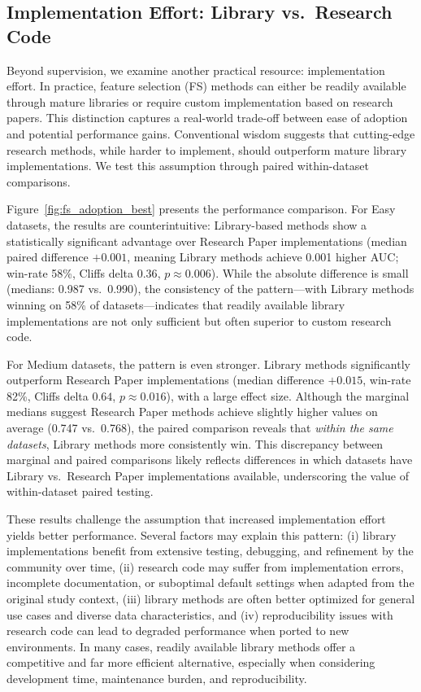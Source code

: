 \documentclass[preprint,12pt,authoryear]{elsarticle}
\begin{document}
{%
\subsection{Implementation Effort: Library vs.\ Research Code}\label{sec:implementation_results}

Beyond supervision, we examine another practical resource: implementation effort. In practice, feature selection (FS) methods can either be readily available through mature libraries or require custom implementation based on research papers. This distinction captures a real-world trade-off between ease of adoption and potential performance gains. Conventional wisdom suggests that cutting-edge research methods, while harder to implement, should outperform mature library implementations. We test this assumption through paired within-dataset comparisons.

Figure~\ref{fig:fs_adoption_best} presents the performance comparison. For Easy datasets, the results are counterintuitive: Library-based methods show a statistically significant advantage over Research Paper implementations (median paired difference $+0.001$, meaning Library methods achieve 0.001 higher AUC; win-rate 58\%, Cliffs delta $0.36$, $p \approx 0.006$). While the absolute difference is small (medians: 0.987 vs.\ 0.990), the consistency of the pattern—with Library methods winning on 58\% of datasets—indicates that readily available library implementations are not only sufficient but often superior to custom research code.

For Medium datasets, the pattern is even stronger. Library methods significantly outperform Research Paper implementations (median difference $+0.015$, win-rate 82\%, Cliffs delta $0.64$, $p \approx 0.016$), with a large effect size. Although the marginal medians suggest Research Paper methods achieve slightly higher values on average (0.747 vs.\ 0.768), the paired comparison reveals that \emph{within the same datasets}, Library methods more consistently win. This discrepancy between marginal and paired comparisons likely reflects differences in which datasets have Library vs.\ Research Paper implementations available, underscoring the value of within-dataset paired testing.

These results challenge the assumption that increased implementation effort yields better performance. Several factors may explain this pattern: (i) library implementations benefit from extensive testing, debugging, and refinement by the community over time, (ii) research code may suffer from implementation errors, incomplete documentation, or suboptimal default settings when adapted from the original study context, (iii) library methods are often better optimized for general use cases and diverse data characteristics, and (iv) reproducibility issues with research code can lead to degraded performance when ported to new environments. In many cases, readily available library methods offer a competitive and far more efficient alternative, especially when considering development time, maintenance burden, and reproducibility.

}
\end{document}
